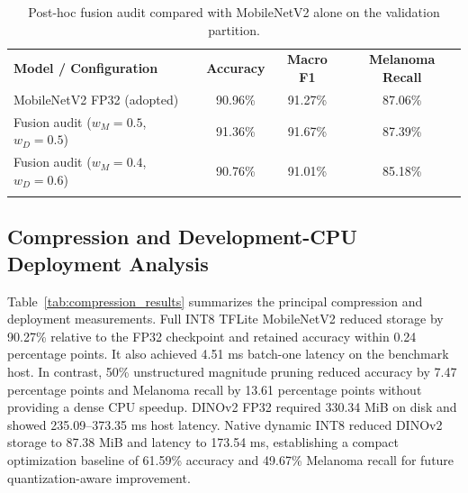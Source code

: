 \documentclass[3p,times,procedia]{elsarticle}
\begin{document}
\begin{table}[htbp]
\centering
\caption{Post-hoc fusion audit compared with MobileNetV2 alone on the validation partition.}
\label{tab:ensemble_results}

\begin{tabular*}{\hsize}{@{\extracolsep{\fill}}lccc}
\toprule
\textbf{Model / Configuration} & \textbf{Accuracy} & \textbf{Macro F1} & \textbf{Melanoma Recall} \\
\colrule
MobileNetV2 FP32 (adopted) & 90.96\% & 91.27\% & 87.06\% \\
Fusion audit ($w_M=0.5$, $w_D=0.5$) & 91.36\% & 91.67\% & 87.39\% \\
Fusion audit ($w_M=0.4$, $w_D=0.6$) & 90.76\% & 91.01\% & 85.18\% \\
\botrule
\end{tabular*}

\end{table}

\subsection{Compression and Development-CPU Deployment Analysis}
\label{sec:compression}

Table~\ref{tab:compression_results} summarizes the principal compression and deployment measurements. Full INT8 TFLite MobileNetV2 reduced storage by 90.27\% relative to the FP32 checkpoint and retained accuracy within 0.24 percentage points. It also achieved 4.51 ms batch-one latency on the benchmark host. In contrast, 50\% unstructured magnitude pruning \cite{han2015} reduced accuracy by 7.47 percentage points and Melanoma recall by 13.61 percentage points without providing a dense CPU speedup. DINOv2 FP32 required 330.34 MiB on disk and showed 235.09--373.35 ms host latency. Native dynamic INT8 reduced DINOv2 storage to 87.38 MiB and latency to 173.54 ms, establishing a compact optimization baseline of 61.59\% accuracy and 49.67\% Melanoma recall for future quantization-aware improvement.
\end{document}
